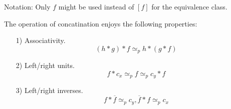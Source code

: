 Notation: Only \( f \) might be used 
instead of \( [f] \) for the equivalence class.

\begin{theorem}
    The operation of concatination
    enjoys the following properties:
    \begin{enumerate}
      \item[1)] Associativity.
        \[
          (h * g) * f \simeq_p h * (g * f)
        \]
      \item[2)] Left/right units.
        \[
          f * c_x \simeq_p f \simeq_p c_y * f
        \]
      \item[3)] Left/right inverses.
        \[
          f * \overline{f} \simeq_p c_y, \overline{f} * f  \simeq_p c_x
        \]
    \end{enumerate}
\end{theorem}

